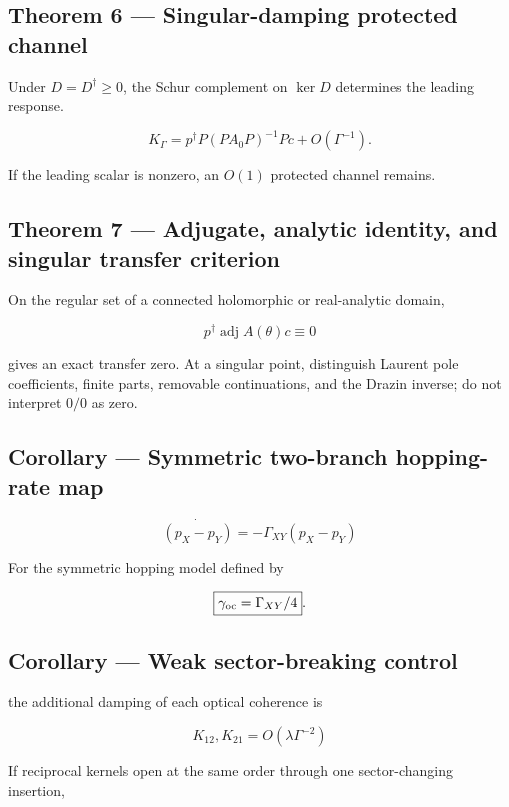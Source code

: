 \documentclass[
  10pt,
  a4paper,
]{article}
\begin{document}
\subsection{Theorem 6 --- Singular-damping protected
channel}\label{theorem-6-singular-damping-protected-channel}

Under \(D=D^\dagger\ge0\), the Schur complement on \(\ker D\) determines
the leading response.

\[
K_\Gamma
=p^\dagger P(PA_0P)^{-1}Pc+O(\Gamma^{-1}).
\]

If the leading scalar is nonzero, an \(O(1)\) protected channel remains.

\subsection{Theorem 7 --- Adjugate, analytic identity, and singular
transfer
criterion}\label{theorem-7-adjugate-analytic-identity-and-singular-transfer-criterion}

On the regular set of a connected holomorphic or real-analytic domain,

\[
p^\dagger\operatorname{adj}A(\theta)c\equiv0
\]

gives an exact transfer zero. At a singular point, distinguish Laurent
pole coefficients, finite parts, removable continuations, and the Drazin
inverse; do not interpret \(0/0\) as zero.

\subsection{Corollary --- Symmetric two-branch hopping-rate
map}\label{corollary-symmetric-two-branch-hopping-rate-map}

\[
\dot{(p_X-p_Y)}=-\Gamma_{XY}(p_X-p_Y)
\]

For the symmetric hopping model defined by

\[
\boxed{\gamma_{\rm oc}=\Gamma_{XY}/4}.
\]

\subsection{Corollary --- Weak sector-breaking
control}\label{corollary-weak-sector-breaking-control}

the additional damping of each optical coherence is

\[
K_{12},K_{21}=O(\lambda\Gamma^{-2})
\]

If reciprocal kernels open at the same order through one sector-changing
insertion,
\end{document}
